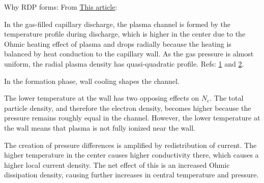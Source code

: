 \documentclass[../main.tex]{subfiles}
\begin{document}
Why RDP forms:
From \href{https://aip.scitation.org/doi/pdf/10.1063/1.5022817}{This article}:

In the gas-filled capillary discharge, the plasma channel is formed by the temperature profile during discharge, which is higher in the center due to the Ohmic heating effect of plasma and drops radially because the heating is balanced by heat conduction to the capillary wall. As the gas pressure is almost uniform, the radial plasma density has quasi-quadratic profile.
Refs: \href{https://journals.aps.org/pre/pdf/10.1103/PhysRevE.71.016401}{1} and \href{https://journals.aps.org/pre/pdf/10.1103/PhysRevE.65.016407}{2}.

In the formation phase, wall cooling shapes the channel.

The lower temperature at the wall has two opposing effects on $N_e$. The total particle density, and therefore the electron  density,  becomes higher because the pressure  remains roughly equal in the channel. However, the  lower temperature at the wall means that  plasma is not fully ionized near the wall.

The creation of pressure differences is amplified by redistribution of current. The  higher temperature in the center causes higher conductivity there, which causes a higher local current density. The net effect of this is an increased Ohmic dissipation density, causing further increases in central temperature and pressure.
\end{document}
